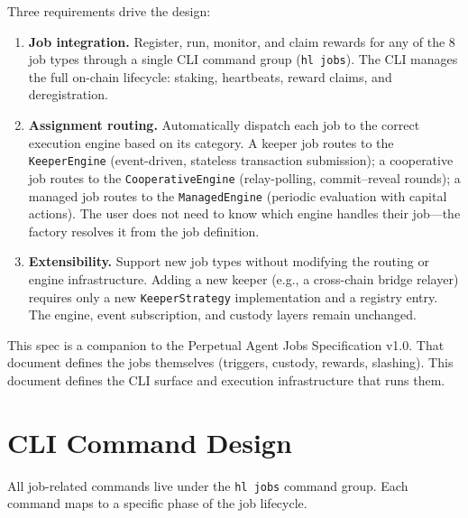 \documentclass[11pt,a4paper]{article}
\begin{document}
Three requirements drive the design:

\begin{enumerate}[leftmargin=2em]
  \item \textbf{Job integration.} Register, run, monitor, and claim rewards for any
        of the 8 job types through a single CLI command group (\texttt{hl jobs}).
        The CLI manages the full on-chain lifecycle: staking, heartbeats, reward
        claims, and deregistration.
  \item \textbf{Assignment routing.} Automatically dispatch each job to the correct
        execution engine based on its category. A keeper job routes to the
        \texttt{KeeperEngine} (event-driven, stateless transaction submission);
        a cooperative job routes to the \texttt{CooperativeEngine} (relay-polling,
        commit--reveal rounds); a managed job routes to the \texttt{ManagedEngine}
        (periodic evaluation with capital actions). The user does not need to know
        which engine handles their job---the factory resolves it from the job
        definition.
  \item \textbf{Extensibility.} Support new job types without modifying the routing
        or engine infrastructure. Adding a new keeper (e.g., a cross-chain bridge
        relayer) requires only a new \texttt{KeeperStrategy} implementation and a
        registry entry. The engine, event subscription, and custody layers remain
        unchanged.
\end{enumerate}

\begin{infobox}
This spec is a companion to the Perpetual Agent Jobs Specification v1.0. That document
defines the jobs themselves (triggers, custody, rewards, slashing). This document
defines the CLI surface and execution infrastructure that runs them.
\end{infobox}

\section{CLI Command Design}

All job-related commands live under the \texttt{hl jobs} command group. Each command
maps to a specific phase of the job lifecycle.
\end{document}
